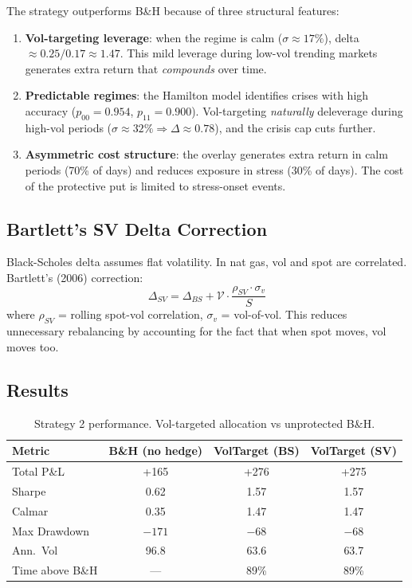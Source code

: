 \documentclass[11pt,a4paper]{article}
\begin{document}
The strategy outperforms B\&H because of three structural features:
\begin{enumerate}[nosep]
\item \textbf{Vol-targeting leverage}: when the regime is calm ($\sigma \approx 17\%$), delta $\approx 0.25/0.17 \approx 1.47$. This mild leverage during low-vol trending markets generates extra return that \emph{compounds} over time.
\item \textbf{Predictable regimes}: the Hamilton model identifies crises with high accuracy ($p_{00} = 0.954$, $p_{11} = 0.900$). Vol-targeting \emph{naturally} deleverage during high-vol periods ($\sigma \approx 32\% \Rightarrow \Delta \approx 0.78$), and the crisis cap cuts further.
\item \textbf{Asymmetric cost structure}: the overlay generates extra return in calm periods (70\% of days) and reduces exposure in stress (30\% of days). The cost of the protective put is limited to stress-onset events.
\end{enumerate}

\subsection{Bartlett's SV Delta Correction}

Black-Scholes delta assumes flat volatility. In nat gas, vol and spot are correlated. Bartlett's (2006) correction:
\begin{equation}
\Delta_{SV} = \Delta_{BS} + \mathcal{V} \cdot \frac{\rho_{SV} \cdot \sigma_v}{S}
\end{equation}
where $\rho_{SV}$ = rolling spot-vol correlation, $\sigma_v$ = vol-of-vol. This reduces unnecessary rebalancing by accounting for the fact that when spot moves, vol moves too.

\subsection{Results}

\begin{table}[H]
\centering
\caption{Strategy 2 performance. Vol-targeted allocation vs unprotected B\&H.}
\label{tab:hedge}
\begin{tabular}{lccc}
\toprule
Metric & B\&H (no hedge) & VolTarget (BS) & VolTarget (SV) \\
\midrule
Total P\&L & +165 & +276 & +275 \\
Sharpe & 0.62 & 1.57 & 1.57 \\
Calmar & 0.35 & 1.47 & 1.47 \\
Max Drawdown & $-171$ & $-68$ & $-68$ \\
Ann.\ Vol & 96.8 & 63.6 & 63.7 \\
Time above B\&H & --- & 89\% & 89\% \\
\bottomrule
\end{tabular}
\end{table}
\end{document}
